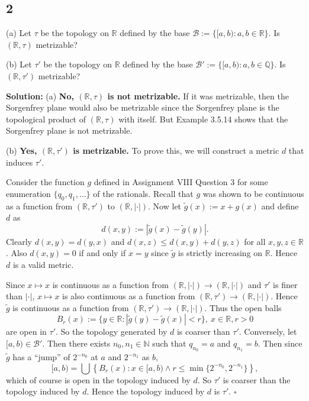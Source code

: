\documentclass[12pt]{article}
\newcounter{ProofCounter}
\newenvironment{Solution}{\stepcounter{ProofCounter}\textbf{Solution:}}{\hfill$\square$}
\begin{document}
\subsection*{2}
\begin{tcolorbox}
  (a) Let $\tau$ be the topology on $\mathbb{R}$ defined by the base $\mathcal{B} := \{[a,b) : a,b \in \mathbb{R}\}$. Is $(\mathbb{R}, \tau)$
  metrizable?

  (b) Let $\tau'$ be the topology on $\mathbb{R}$ defined by the base $\mathcal{B}' := \{[a,b) : a, b \in \mathbb{Q}\}$. Is $(\mathbb{R}, \tau')$
  metrizable?
\end{tcolorbox}
\begin{Solution}
  (a) \textbf{No, $(\mathbb{R}, \tau)$ is not metrizable.} If it was metrizable, then the Sorgenfrey plane would also be metrizable since the Sorgenfrey plane
  is the topological product of $(\mathbb{R}, \tau)$ with itself. But Example 3.5.14 shows
  that the Sorgenfrey plane is not metrizable.

  (b) \textbf{Yes, $(\mathbb{R}, \tau')$ is metrizable.} To prove this, we will construct a metric $d$ that induces $\tau'$.

  Consider the function $g$ defined in Assignment VIII Question 3 for some enumeration $\{q_0, q_1, \dots \}$ of the rationals. 
  Recall that $g$ was shown to be continuous as a function from $(\mathbb{R}, \tau')$ to
  $(\mathbb{R}, |\cdot|)$. Now let $\tilde{g}(x) := x + g(x)$ and define $d$ as 
  \[
    d(x,y) := |\tilde{g}(x) - \tilde{g}(y)|.
  \]
  Clearly $d(x,y) = d(y,x)$ and $d(x,z) \leq d(x,y) + d(y,z)$ for all $x, y, z \in \mathbb{R}$. Also $d(x, y) = 0$ if and only if $x = y$ since
  $\tilde{g}$ is strictly increasing on $\mathbb{R}$.
  Hence $d$ is a valid metric.

  Since $x \mapsto x$ is continuous as a function from  $(\mathbb{R}, |\cdot|)
  \rightarrow (\mathbb{R}, |\cdot|)$ and $\tau'$ is finer than
  $|\cdot|$, $x \mapsto x$ is also continuous as a function from $(\mathbb{R}, \tau') \rightarrow (\mathbb{R}, |\cdot|)$.
  Hence $\tilde{g}$ is continuous as a function from $(\mathbb{R}, \tau') \rightarrow (\mathbb{R}, |\cdot|)$. Thus the open balls
  \[
    B_r(x) := \{ y \in \mathbb{R} : |\tilde{g}(y) - \tilde{g}(x)| < r \}, \ x \in \mathbb{R}, r > 0
  \]
  are open in $\tau'$. So the topology generated by $d$ is coarser than $\tau'$. Conversely, let $[a,b) \in \mathcal{B}'$. Then there exists $n_0, n_1 \in
  \mathbb{N}$ such that $q_{n_0} = a$ and $q_{n_1} = b$. Then since $\tilde{g}$ has a ``jump'' of $2^{-{n_0}}$ at $a$ and $2^{-n_1}$ as $b$,
  \[
    [a,b) = \bigcup \left\{ B_r(x) : x \in [a,b) \wedge r \leq \min\{ 2^{-n_0}, 2^{-n_1}\} \right\},
  \]
  which of course is open in the topology induced by $d$. So $\tau'$ is coarser than the topology induced by $d$.
  Hence the topology induced by $d$ is $\tau'$.
\end{Solution}
\end{document}
